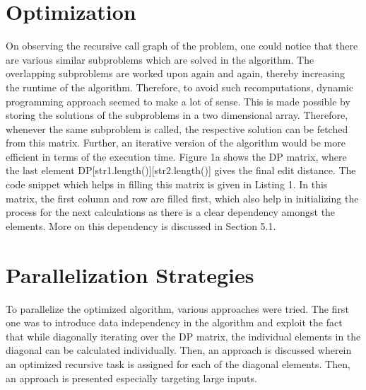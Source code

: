 \documentclass[a4paper,10pt,twoside]{article}
\begin{document}
\section{Optimization}
On observing the recursive call graph of the problem, one could notice that there are various similar subproblems which are solved in the algorithm. The overlapping subproblems are worked upon again and again, thereby increasing the runtime of the algorithm. Therefore, to avoid such recomputations, dynamic programming approach seemed to make a lot of sense. This is made possible by storing the solutions of the subproblems in a two dimensional array. Therefore, whenever the same subproblem is called, the respective solution can be fetched from this matrix. Further, an iterative version of the algorithm would be more efficient in terms of the execution time. Figure 1a shows the DP matrix, where the last element DP[str1.length()][str2.length()] gives the final edit distance. The code snippet which helps in filling this matrix is given in Listing 1. In this matrix, the first column and row are filled first, which also help in initializing the process for the next calculations as there is a clear dependency amongst the elements. More on this dependency is discussed in Section 5.1.

\section{Parallelization Strategies}
To parallelize the optimized algorithm, various approaches were tried. The first one was to introduce data independency in the algorithm and exploit the fact that while diagonally iterating over the DP matrix, the individual elements in the diagonal can be calculated individually. Then, an approach is discussed wherein an optimized recursive task is assigned for each of the diagonal elements. Then, an approach is presented especially targeting large inputs.
\end{document}
